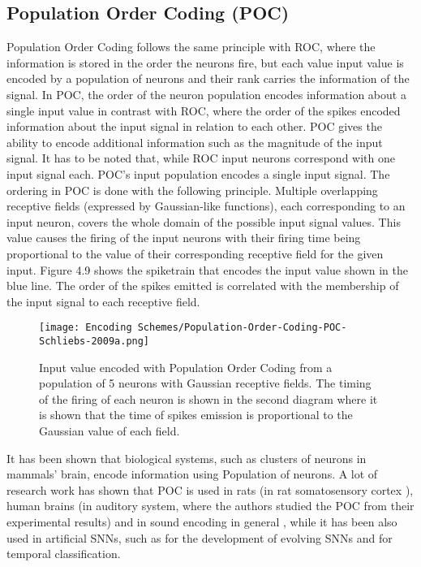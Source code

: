 \documentclass[12pt]{report}
\begin{document}
\subsection{Population Order Coding (POC)}

Population Order Coding follows the same principle with ROC, where the information is stored in the order the neurons fire, but each value input value is encoded by a population of neurons and their rank carries the information of the signal. In POC, the order of the neuron population encodes information about a single input value in contrast with ROC, where the order of the spikes encoded information about the input signal in relation to each other. POC gives the ability to encode additional information such as the magnitude of the input signal. It has to be noted that, while ROC  input neurons correspond with one input signal each. POC's input population encodes a single input signal. The ordering in POC is done with the following principle. Multiple overlapping receptive fields (expressed by Gaussian-like functions), each corresponding to an input neuron, covers the whole domain of the possible input signal values. This value causes the firing of the input neurons with their firing time being proportional to the value of their corresponding receptive field for the given input\cite{Kasabov2018}. Figure 4.9 shows the spiketrain that encodes the input value shown in the blue line. The order of the spikes emitted is correlated with the membership of the input signal to each receptive field.

\begin{figure}[htp]
    \centering
    \texttt{[image: Encoding Schemes/Population-Order-Coding-POC-Schliebs-2009a.png]}
    \caption{Input value encoded with Population Order Coding from a population of 5 neurons with Gaussian receptive fields. The timing of the firing of each neuron is shown in the second diagram where it is shown that the time of spikes emission is proportional to the Gaussian value of each field.}
    \label{fig:spikeprop-net-architecture}
\end{figure}

It has been shown that biological systems, such as clusters of neurons in mammals' brain, encode information using Population of neurons. A lot of research work has shown that POC is used in rats (in rat somatosensory cortex \cite{Petersen2001}), human brains (in auditory system\cite{Onken2014}, where the authors studied the POC from their experimental results) and in sound encoding in general \cite{Dean2005}, while it has been also used in artificial SNNs, such as for the development of evolving SNNs\cite{Soltic2010} and for temporal classification\cite{Pan2019}. 
\end{document}

